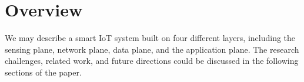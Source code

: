 
\section{Overview}

We may describe a smart IoT system built on four different layers, including the sensing plane, network plane, data plane, and the application plane. The research challenges, related work, and future directions could be discussed in the following sections of the paper.